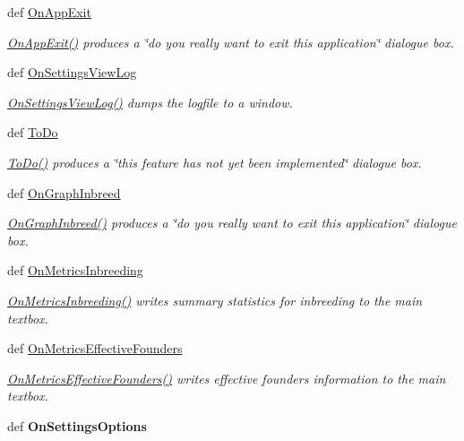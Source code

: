 \begin{DoxyCompactItemize}
def \hyperlink{classPyPedal_1_1pyp__gui_1_1MainWindow_a32bedae6c29388bbc5878e58b5e6d59d}{OnAppExit}
\begin{DoxyCompactList}\small\item\em \hyperlink{classPyPedal_1_1pyp__gui_1_1MainWindow_a32bedae6c29388bbc5878e58b5e6d59d}{OnAppExit()} produces a \char`\"{}do you really want to exit this application\char`\"{} dialogue box. \end{DoxyCompactList}\item 
def \hyperlink{classPyPedal_1_1pyp__gui_1_1MainWindow_ab074d79a936f1596c15778e801eb9da7}{OnSettingsViewLog}
\begin{DoxyCompactList}\small\item\em \hyperlink{classPyPedal_1_1pyp__gui_1_1MainWindow_ab074d79a936f1596c15778e801eb9da7}{OnSettingsViewLog()} dumps the logfile to a window. \end{DoxyCompactList}\item 
def \hyperlink{classPyPedal_1_1pyp__gui_1_1MainWindow_a4b5adafe34e9923eac05fb61bf1494f2}{ToDo}
\begin{DoxyCompactList}\small\item\em \hyperlink{classPyPedal_1_1pyp__gui_1_1MainWindow_a4b5adafe34e9923eac05fb61bf1494f2}{ToDo()} produces a \char`\"{}this feature has not yet been implemented\char`\"{} dialogue box. \end{DoxyCompactList}\item 
def \hyperlink{classPyPedal_1_1pyp__gui_1_1MainWindow_a81cca0ed359f097967bd5e454a050ae0}{OnGraphInbreed}
\begin{DoxyCompactList}\small\item\em \hyperlink{classPyPedal_1_1pyp__gui_1_1MainWindow_a81cca0ed359f097967bd5e454a050ae0}{OnGraphInbreed()} produces a \char`\"{}do you really want to exit this application\char`\"{} dialogue box. \end{DoxyCompactList}\item 
def \hyperlink{classPyPedal_1_1pyp__gui_1_1MainWindow_a4990fc004a6796183a52be9ce34a1d6b}{OnMetricsInbreeding}
\begin{DoxyCompactList}\small\item\em \hyperlink{classPyPedal_1_1pyp__gui_1_1MainWindow_a4990fc004a6796183a52be9ce34a1d6b}{OnMetricsInbreeding()} writes summary statistics for inbreeding to the main textbox. \end{DoxyCompactList}\item 
def \hyperlink{classPyPedal_1_1pyp__gui_1_1MainWindow_a5fcaaf8521d0df2a691c85569cd667b4}{OnMetricsEffectiveFounders}
\begin{DoxyCompactList}\small\item\em \hyperlink{classPyPedal_1_1pyp__gui_1_1MainWindow_a5fcaaf8521d0df2a691c85569cd667b4}{OnMetricsEffectiveFounders()} writes effective founders information to the main textbox. \end{DoxyCompactList}\item 
\hypertarget{classPyPedal_1_1pyp__gui_1_1MainWindow_ac18c336fed82db611adf8aad2346c7d2}{
def {\bfseries OnSettingsOptions}}
\label{classPyPedal_1_1pyp__gui_1_1MainWindow_ac18c336fed82db611adf8aad2346c7d2}

\end{DoxyCompactItemize}
